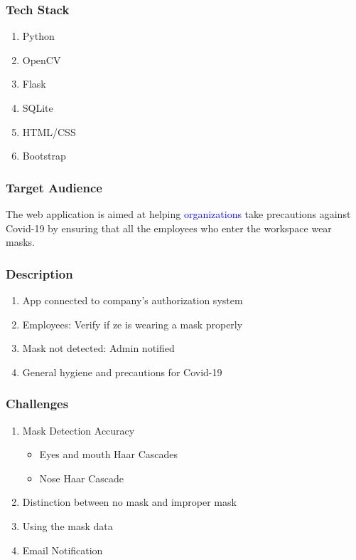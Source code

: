 \documentclass[14pt]{beamer}
\begin{document}
\begin{frame}
    \frametitle{Tech Stack}
    \begin{enumerate}
        \item Python
        \item OpenCV
        \item Flask
        \item SQLite
        \item HTML/CSS
        \item Bootstrap
    \end{enumerate}
\end{frame} 

\begin{frame}
    \frametitle{Target Audience}
    The web application is aimed at helping \textcolor{blue}{organizations} take precautions against Covid-19 by ensuring that all the employees who enter the workspace wear masks.
\end{frame}

\begin{frame}
    \frametitle{Description}
    \begin{enumerate}
        \item App connected to company's authorization system
        \item Employees: Verify if ze is wearing a mask properly
        \item Mask not detected: Admin notified
        \item General hygiene and precautions for Covid-19
    \end{enumerate}
\end{frame}


\begin{frame}
    \frametitle{Challenges}
    \begin{enumerate}
        \item Mask Detection Accuracy
            \begin{itemize}
            \item Eyes and mouth Haar Cascades
            \item Nose Haar Cascade
            \end{itemize}
        \item Distinction between no mask and improper mask
        \item Using the mask data
        \item Email Notification 
    \end{enumerate}
\end{frame}
\end{document}
